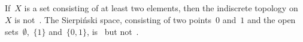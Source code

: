 \subsection{}

If~$X$ is a set consisting of at least two elements, then the indiscrete topology on~$X$ is not~.
The Sierpiński space, consisting of two points~$0$ and~$1$ and the open sets~$∅$,~$\{ 1 \}$ and~$\{ 0, 1 \}$, is~ but not~.
